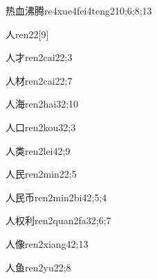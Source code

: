 \begin{verbete}{热血沸腾}{re4xue4fei4teng2}{10;6;8;13}
\end{verbete}

\begin{verbete}{人}{ren2}{2}[9]
\end{verbete}

\begin{verbete}{人才}{ren2cai2}{2;3}
\end{verbete}

\begin{verbete}{人材}{ren2cai2}{2;7}
\end{verbete}

\begin{verbete}{人海}{ren2hai3}{2;10}
\end{verbete}

\begin{verbete}{人口}{ren2kou3}{2;3}
\end{verbete}

\begin{verbete}{人类}{ren2lei4}{2;9}
\end{verbete}

\begin{verbete}{人民}{ren2min2}{2;5}
\end{verbete}

\begin{verbete}{人民币}{ren2min2bi4}{2;5;4}
\end{verbete}

\begin{verbete}{人权利}{ren2quan2fa3}{2;6;7}
\end{verbete}

\begin{verbete}{人像}{ren2xiang4}{2;13}
\end{verbete}

\begin{verbete}{人鱼}{ren2yu2}{2;8}
\end{verbete}

